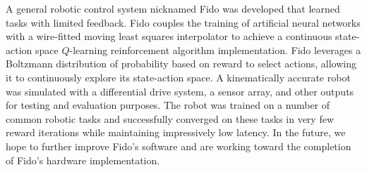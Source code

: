 A general robotic control system nicknamed Fido was developed that learned tasks with limited feedback. Fido couples the training of artificial neural networks with a wire-fitted moving least squares interpolator to achieve a continuous state-action space $Q$-learning reinforcement algorithm implementation. Fido leverages a Boltzmann distribution of probability based on reward to select actions, allowing it to continuously explore its state-action space. A kinematically accurate robot was simulated with a differential drive system, a sensor array, and other outputs for testing and evaluation purposes. The robot was trained on a number of common robotic tasks and successfully converged on these tasks in very few reward iterations while maintaining impressively low latency. In the future, we hope to further improve Fido's software and are working toward the completion of Fido's hardware implementation.